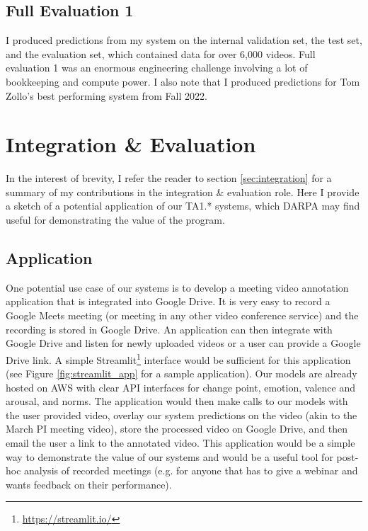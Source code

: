 \documentclass[12pt]{article}
\begin{document}
\subsection{Full Evaluation 1}
I produced predictions from  my system on the internal validation set, the test set, and the evaluation set, which contained data for over 6,000 videos. Full evaluation 1 was an enormous engineering challenge involving a lot of bookkeeping and compute power. I also note that I produced predictions for Tom Zollo's best performing system from Fall 2022.

\section{Integration \& Evaluation}
In the interest of brevity, I refer the reader to section \ref{sec:integration} for a summary of my contributions in the integration \& evaluation role. Here I provide a sketch of a potential application of our TA1.* systems, which DARPA may find useful for demonstrating the value of the program.

\subsection{Application}
One potential use case of our systems is to develop a meeting video annotation application that is integrated into Google Drive. It is very easy to record a Google Meets meeting (or meeting in any other video conference service) and the recording is stored in Google Drive. An application can then integrate with Google Drive and listen for newly uploaded videos or a user can provide a Google Drive link. A simple Streamlit\footnote{\url{https://streamlit.io/}} interface would be sufficient for this application (see Figure \ref{fig:streamlit_app} for a sample application). Our models are already hosted on AWS with clear API interfaces for change point, emotion, valence and arousal, and norms. The application would then make calls to our models with the user provided video, overlay our system predictions on the video (akin to the March PI meeting video), store the processed video on Google Drive, and then email the user a link to the annotated video. This application would be a simple way to demonstrate the value of our systems and would be a useful tool for post-hoc analysis of recorded meetings (e.g. for anyone that has to give a webinar and wants feedback on their performance).
\end{document}
